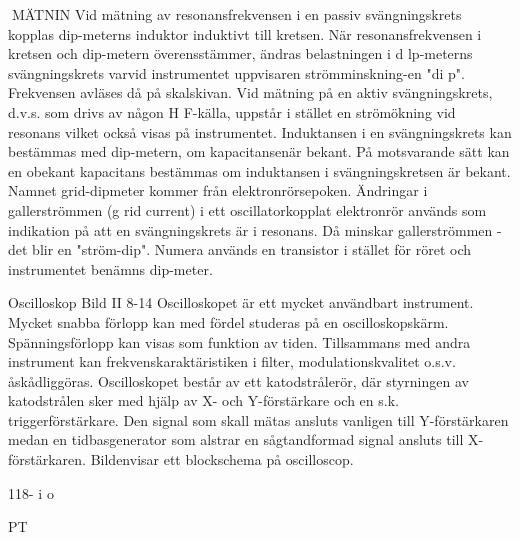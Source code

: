 MÄTNIN
Vid mätning av resonansfrekvensen i en
passiv svängningskrets kopplas dip-meterns
induktor induktivt till kretsen. När resonansfrekvensen i kretsen och dip-metern överensstämmer, ändras belastningen i d lp-meterns svängningskrets varvid instrumentet
uppvisaren strömminskning-en "di p". Frekvensen avläses då på skalskivan.
Vid mätning på en aktiv svängningskrets,
d.v.s. som drivs av någon H F-källa, uppstår
i stället en strömökning vid resonans vilket
också visas på instrumentet.
Induktansen i en svängningskrets kan
bestämmas med dip-metern, om kapacitansenär bekant. På motsvarande sätt kan en
obekant kapacitans bestämmas om induktansen i svängningskretsen är bekant.
Namnet grid-dipmeter kommer från
elektronrörsepoken. Ändringar i gallerströmmen (g rid current) i ett oscillatorkopplat
elektronrör används som indikation på att en
svängningskrets är i resonans. Då minskar
gallerströmmen - det blir en "ström-dip".
Numera används en transistor i stället för
röret och instrumentet benämns dip-meter.

Oscilloskop
Bild II 8-14
Oscilloskopet är ett mycket användbart instrument. Mycket snabba förlopp kan med
fördel studeras på en oscilloskopskärm.
Spänningsförlopp kan visas som funktion av tiden. Tillsammans med andra instrument kan frekvenskaraktäristiken i filter,
modulationskvalitet o.s.v. åskådliggöras.
Oscilloskopet består av ett katodstrålerör, där styrningen av katodstrålen sker med
hjälp av X- och Y-förstärkare och en s.k.
triggerförstärkare. Den signal som skall mätas ansluts vanligen till Y-förstärkaren medan
en tidbasgenerator som alstrar en sågtandformad signal ansluts till X-förstärkaren.
Bildenvisar ett blockschema på oscilloscop.

118- i o

PT
